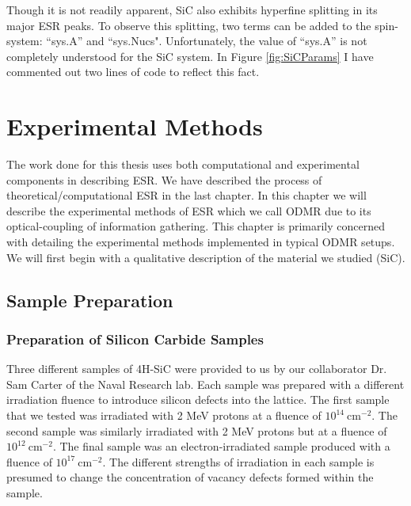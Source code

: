 \documentclass[oneside]{BYUPhys}
\begin{document}
Though it is not readily apparent, SiC also exhibits hyperfine splitting in its major ESR peaks. To observe this splitting, two terms can be added to the spin-system: ``sys.A'' and ``sys.Nucs". Unfortunately, the value of ``sys.A'' is not completely understood for the SiC system. In Figure \ref{fig:SiCParams} I have commented out two lines of code to reflect this fact.
 










\chapter{Experimental Methods}

The work done for this thesis uses both computational and experimental components in describing ESR. We have described the process of theoretical/computational ESR in the last chapter. In this chapter we will describe the experimental methods of ESR which we call ODMR due to its optical-coupling of information gathering. This chapter is primarily concerned with detailing the experimental methods implemented in typical ODMR setups. We will first begin with a qualitative description of the material we studied (SiC).

\section{Sample Preparation}

\subsection{Preparation of Silicon Carbide Samples}
\label{sec:SiCSamples}

Three different samples of 4H-SiC were provided to us by our collaborator Dr. Sam Carter of the Naval Research lab. Each sample was prepared with a different irradiation fluence to introduce silicon defects into the lattice. The first sample that we tested was irradiated with 2 MeV protons at a fluence of $10^{14}~\text{cm}^{-2}$. The second sample was similarly irradiated with 2 MeV protons but at a fluence of $10^{12}~\text{cm}^{-2}$. The final sample was an electron-irradiated sample produced with a fluence of $10^{17}~\text{cm}^{-2}$. The different strengths of irradiation in each sample is presumed to change the concentration of vacancy defects formed within the sample.
\end{document}
